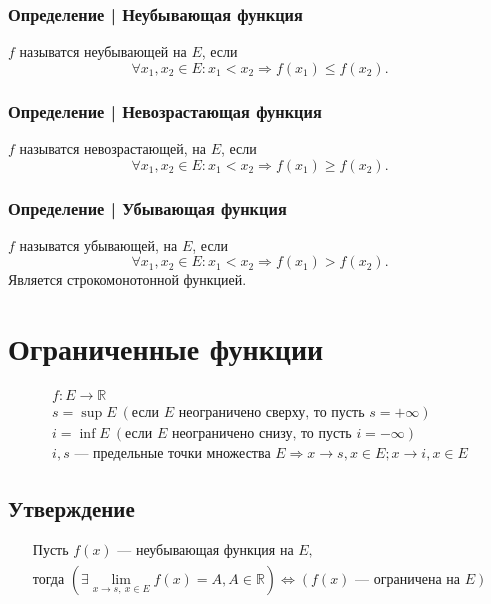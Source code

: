 \documentclass{article}
\begin{document}
\subsubsection{Определение | Неубывающая функция}
$f$ называтся неубывающей на $E$, если
\[
    \forall x_1, x_2 \in E: x_1 < x_2 \Rightarrow f(x_1) \le f(x_2).
\]

\subsubsection{Определение | Невозрастающая функция}
$f$ называтся невозрастающей, на $E$, если
\[
    \forall x_1, x_2 \in E: x_1 < x_2 \Rightarrow f(x_1) \ge f(x_2).
\]

\subsubsection{Определение | Убывающая функция}
$f$ называтся убывающей, на $E$, если
\[
    \forall x_1, x_2 \in E: x_1 < x_2 \Rightarrow f(x_1) > f(x_2).
\]
Является строкомонотонной функцией.


\section{Ограниченные функции}
\begin{gather*}
    f: E \rightarrow \mathbb{R} \\
    s = \sup E ~ (\text{если } E \text{ неограничено сверху, то пусть } s = +\infty) \\
    i = \inf E ~ (\text{если } E \text{ неограничено снизу,  то пусть } i = -\infty) \\
    i, s \text{ --- предельные точки множества } E \Rightarrow
    x \rightarrow s, x \in E; x \rightarrow i, x \in E
\end{gather*}

\subsection{Утверждение} 
\begin{gather*}
    \text{Пусть } f(x) \text{ --- неубывающая функция на } E, \\
    \text{тогда } \left( \exists \lim_{x \to s, ~ x \in E} f(x) = A, A \in \mathbb{R} \right) \Leftrightarrow
    \left( f(x) \text{ --- ограничена на } E \right)
\end{gather*}
\end{document}
